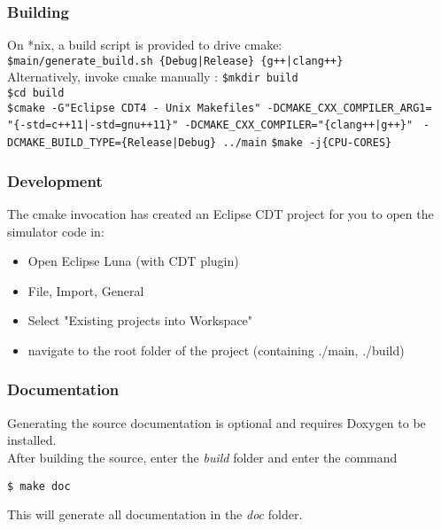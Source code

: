 \subsubsection{Building}
On *nix, a build script is provided to drive cmake:\\
\lstinline!$main/generate_build.sh {Debug|Release} {g++|clang++}!\\
Alternatively, invoke cmake manually :
\lstinline!$mkdir build!\\
\lstinline!$cd build!\\
\lstinline!$cmake -G"Eclipse CDT4 - Unix Makefiles" -DCMAKE_CXX_COMPILER_ARG1=!\\
\lstinline!"{-std=c++11|-std=gnu++11}" -DCMAKE_CXX_COMPILER="{clang++|g++}" !
\lstinline!-DCMAKE_BUILD_TYPE={Release|Debug} ../main!
\lstinline!$make -j{CPU-CORES}!\\
\subsubsection{Development}
The cmake invocation has created an Eclipse CDT project for you to open the simulator code in:
\begin{itemize}
  \item Open Eclipse Luna (with CDT plugin)
  \item File, Import, General
  \item Select "Existing projects into Workspace"
  \item navigate to the root folder of the project (containing ./main, ./build)
\end{itemize}

\subsubsection{Documentation}
Generating the source documentation is optional and requires Doxygen to be installed.\\
After building the source, enter the \textsl{build} folder and enter the command 
\begin{verbatim}
$ make doc
\end{verbatim} This will generate all documentation in the \textsl{doc} folder.